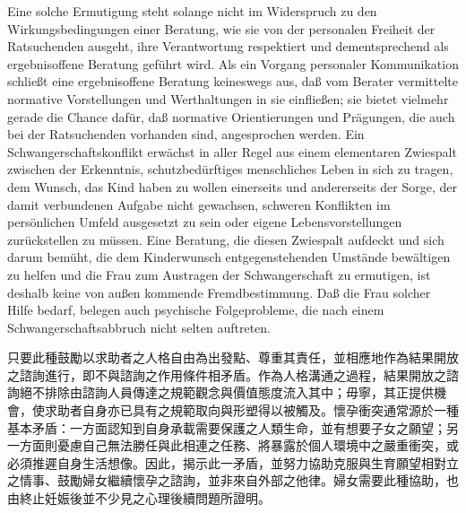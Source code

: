 \documentclass[12pt]{article}
\begin{document}
\begin{sourcepara}[title={原文D.110}]
Eine solche Ermutigung steht solange nicht im Widerspruch zu den Wirkungsbedingungen einer Beratung, wie sie von der personalen Freiheit der Ratsuchenden ausgeht, ihre Verantwortung respektiert und dementsprechend als ergebnisoffene Beratung geführt wird. Als ein Vorgang personaler Kommunikation schließt eine ergebnisoffene Beratung keineswegs aus, daß vom Berater vermittelte normative Vorstellungen und Werthaltungen in sie einfließen; sie bietet vielmehr gerade die Chance dafür, daß normative Orientierungen und Prägungen, die auch bei der Ratsuchenden vorhanden sind, angesprochen werden. Ein Schwangerschaftskonflikt erwächst in aller Regel aus einem elementaren Zwiespalt zwischen der Erkenntnis, schutzbedürftiges menschliches Leben in sich zu tragen, dem Wunsch, das Kind haben zu wollen einerseits und andererseits der Sorge, der damit verbundenen Aufgabe nicht gewachsen, schweren Konflikten im persönlichen Umfeld ausgesetzt zu sein oder eigene Lebensvorstellungen zurückstellen zu müssen. Eine Beratung, die diesen Zwiespalt aufdeckt und sich darum bemüht, die dem Kinderwunsch entgegenstehenden Umstände bewältigen zu helfen und die Frau zum Austragen der Schwangerschaft zu ermutigen, ist deshalb keine von außen kommende Fremdbestimmung. Daß die Frau solcher Hilfe bedarf, belegen auch psychische Folgeprobleme, die nach einem Schwangerschaftsabbruch nicht selten auftreten.
\end{sourcepara}
\begin{transpara}
只要此種鼓勵以求助者之人格自由為出發點、尊重其責任，並相應地作為結果開放之諮詢進行，即不與諮詢之作用條件相矛盾。作為人格溝通之過程，結果開放之諮詢絕不排除由諮詢人員傳達之規範觀念與價值態度流入其中；毋寧，其正提供機會，使求助者自身亦已具有之規範取向與形塑得以被觸及。懷孕衝突通常源於一種基本矛盾：一方面認知到自身承載需要保護之人類生命，並有想要子女之願望；另一方面則憂慮自己無法勝任與此相連之任務、將暴露於個人環境中之嚴重衝突，或必須推遲自身生活想像。因此，揭示此一矛盾，並努力協助克服與生育願望相對立之情事、鼓勵婦女繼續懷孕之諮詢，並非來自外部之他律。婦女需要此種協助，也由終止妊娠後並不少見之心理後續問題所證明。
\end{transpara}
\end{document}
